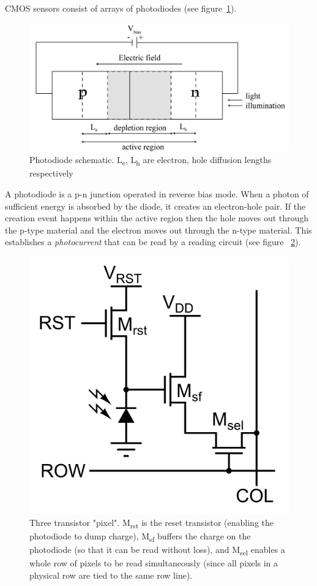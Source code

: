 CMOS sensors consist of arrays of photodiodes (see figure~\ref{fig:photodiode.png}).
\begin{figure}
    \includegraphics[width=\linewidth,keepaspectratio]{figures/photodiode.png}
    \caption{Photodiode schematic. L\textsubscript{e}, L\textsubscript{h} are electron, hole diffusion lengths respectively\cite{Xu2015FundamentalCO}}
    \label{fig:photodiode.png}
\end{figure}
A photodiode is a p-n junction operated in reverse bias mode.
%
When a photon of sufficient energy is absorbed by the diode, it creates an electron-hole pair.
%
If the creation event happens within the active region then the hole moves out through the p-type material and the electron moves out through the n-type material.
%
This establishes a \textit{photocurrent} that can be read by a reading circuit (see figure ~\ref{fig:3tpixel}).
\begin{figure}
    \center
    \includegraphics[width=.5\linewidth,keepaspectratio]{figures/3t_pixel.png}
    \caption{Three transistor "pixel". M\textsubscript{rst} is the reset transistor (enabling the photodiode to dump charge), M\textsubscript{sf} buffers the charge on the photodiode (so that it can be read without loss), and M\textsubscript{sel} enables a whole row of pixels to be read simultaneously (since all pixels in a physical row are tied to the same row line).}
    \label{fig:3tpixel}
\end{figure}
